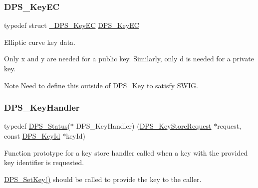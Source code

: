 \subsubsection{\texorpdfstring{D\+P\+S\+\_\+\+Key\+EC}{DPS\_KeyEC}}
{\footnotesize\ttfamily typedef struct \hyperlink{struct___d_p_s___key_e_c}{\+\_\+\+D\+P\+S\+\_\+\+Key\+EC}  \hyperlink{group__keystore_ga658140277e0cd5c6ccc3b7727ecaae8a}{D\+P\+S\+\_\+\+Key\+EC}}



Elliptic curve key data. 

Only {\ttfamily x} and {\ttfamily y} are needed for a public key. Similarly, only {\ttfamily d} is needed for a private key.

\begin{DoxyNote}{Note}
Need to define this outside of D\+P\+S\+\_\+\+Key to satisfy S\+W\+IG. 
\end{DoxyNote}
\mbox{\label{group__keystore_gaccf7e3d43bc1e586132d7f1ae03d02f7}} 
\subsubsection{\texorpdfstring{D\+P\+S\+\_\+\+Key\+Handler}{DPS\_KeyHandler}}
{\footnotesize\ttfamily typedef \hyperlink{group__status_ga30395a84d3cad9d4ec29848106415038}{D\+P\+S\+\_\+\+Status}($\ast$ D\+P\+S\+\_\+\+Key\+Handler) (\hyperlink{group__keystore_ga7c3e50965b65334e9791780fa855ed16}{D\+P\+S\+\_\+\+Key\+Store\+Request} $\ast$request, const \hyperlink{group__keystore_ga4345e29dd2ad5d7fd88a1e988787bd72}{D\+P\+S\+\_\+\+Key\+Id} $\ast$key\+Id)}



Function prototype for a key store handler called when a key with the provided key identifier is requested. 

\hyperlink{group__keystore_ga15d6a9b8256b67c2ec8b1d365a98dbab}{D\+P\+S\+\_\+\+Set\+Key()} should be called to provide the key to the caller.


